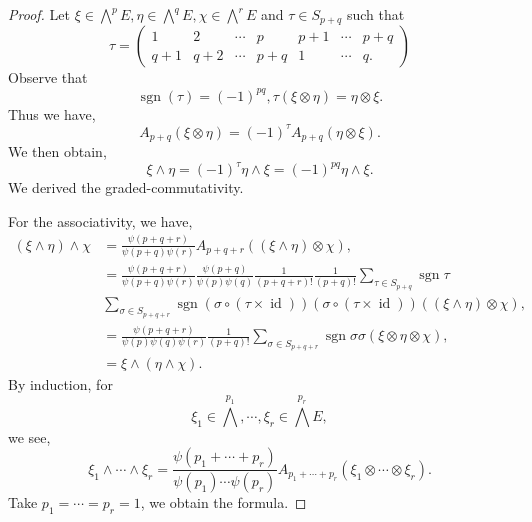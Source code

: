 \documentclass[8pt]{article}
\DeclareMathOperator{\id}{id}
\DeclareMathOperator{\sgn}{sgn}
\begin{document}
\begin{proof}
  Let $\xi\in\bigwedge^pE,\eta\in \bigwedge^qE,\chi\in\bigwedge^rE$ and $\tau\in S_{p+q}$ such that 
  \begin{equation*}
    \tau = \begin{pmatrix}
      1 & 2 &\cdots & p & p+1&\cdots&p+q\\
      q+1 & q+2& \cdots &p+q& 1 & \cdots & q.
    \end{pmatrix}
  \end{equation*}
  Observe that 
  \begin{equation*}
    \sgn(\tau) = (-1)^{pq},\tau(\xi\otimes \eta) = \eta\otimes \xi.
  \end{equation*}
  Thus we have,
  \begin{equation*}
    A_{p+q}(\xi\otimes \eta) = (-1)^\tau A_{p+q}(\eta\otimes \xi).
  \end{equation*}
  We then obtain,
  \begin{equation*}
    \xi\wedge\eta = (-1)^\tau\eta\wedge\xi = (-1)^{pq}\eta\wedge\xi.
  \end{equation*}
  We derived the graded-commutativity.
  \par For the associativity, we have,
  \begin{align*}
    (\xi\wedge \eta)\wedge\chi & = {\frac {\psi(p+q+r)} {\psi(p+q)\psi(r)}} A_{p+q+r}((\xi\wedge\eta)\otimes \chi),\\
    & = {\frac {\psi(p+q+r)} {\psi(p+q)\psi(r)}}{\frac {\psi(p+q)} {\psi(p)\psi(q)}} {\frac 1 {(p+q+r)!}}{\frac 1 {(p+q)!}}\sum_{\tau\in S_{p+q}}\sgn\tau\\
    &\sum_{\sigma\in S_{p+q+r}}\sgn(\sigma\circ(\tau\times\id))(\sigma\circ(\tau\times \id))((\xi\wedge\eta)\otimes \chi),\\
    & = {\frac {\psi(p+q+r)} {\psi(p)\psi(q)\psi(r)}}{\frac 1 {(p+q)!}}\sum_{\sigma\in S_{p+q+r}}\sgn\sigma\sigma(\xi\otimes\eta\otimes\chi),\\
    & = \xi\wedge(\eta\wedge\chi).
  \end{align*}
  By induction, for
  \begin{equation*}
    \xi_1\in\bigwedge^{p_1},\cdots,\xi_r\in\bigwedge^{p_r}E,
  \end{equation*}
  we see,
  \begin{equation*}
    \xi_1\wedge\cdots\wedge \xi_r = {\frac {\psi(p_1+\cdots+p_r)} {\psi(p_1)\cdots\psi(p_r)}}A_{p_1+\cdots+p_r}(\xi_1\otimes\cdots\otimes\xi_r).
  \end{equation*}
  Take $p_1=\cdots=p_r=1$, we obtain the formula.

\end{proof}
\end{document}
